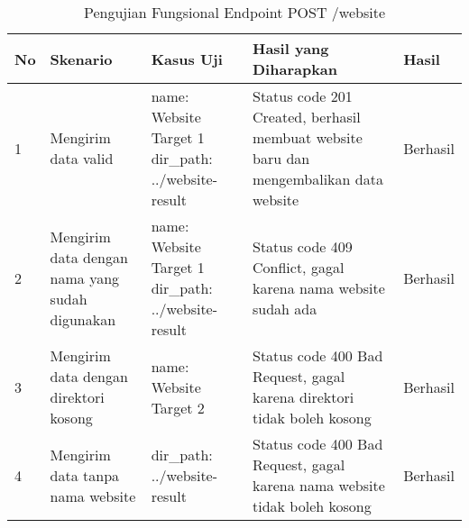 \begin{table}[H]
    \centering
    \begin{tabular}{|p{0.5cm}|p{3cm}|p{5cm}|p{5cm}|p{1.5cm}|}
        \hline
        \rowcolor[HTML]{DAE8FC} 
        \textbf{No} & \textbf{Skenario} & \textbf{Kasus Uji} & \textbf{Hasil yang Diharapkan} & \textbf{Hasil} \\ \hline
        1 & Mengirim data valid & 
        name: Website Target 1 \newline 
        dir\_path: ../website-result & 
        Status code 201 Created, berhasil membuat website baru dan mengembalikan data website & 
        Berhasil \\ \hline
        2 & Mengirim data dengan nama yang sudah digunakan & 
        name: Website Target 1 \newline 
        dir\_path: ../website-result & 
        Status code 409 Conflict, gagal karena nama website sudah ada & 
        Berhasil \\ \hline
        3 & Mengirim data dengan direktori kosong & 
        name: Website Target 2 & 
        Status code 400 Bad Request, gagal karena direktori tidak boleh kosong & 
        Berhasil \\ \hline
        4 & Mengirim data tanpa nama website & 
        dir\_path: ../website-result & 
        Status code 400 Bad Request, gagal karena nama website tidak boleh kosong & 
        Berhasil \\ \hline
    \end{tabular}
    \caption{Pengujian Fungsional Endpoint POST /website}
    \label{tab:website_create_testing}
\end{table}
